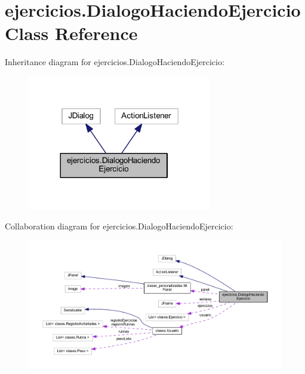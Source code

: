 \hypertarget{classejercicios_1_1_dialogo_haciendo_ejercicio}{}\section{ejercicios.\+Dialogo\+Haciendo\+Ejercicio Class Reference}
\label{classejercicios_1_1_dialogo_haciendo_ejercicio}


Inheritance diagram for ejercicios.\+Dialogo\+Haciendo\+Ejercicio\+:
\nopagebreak
\begin{figure}[H]
\begin{center}
\leavevmode
\includegraphics[width=228pt]{classejercicios_1_1_dialogo_haciendo_ejercicio__inherit__graph}
\end{center}
\end{figure}


Collaboration diagram for ejercicios.\+Dialogo\+Haciendo\+Ejercicio\+:
\nopagebreak
\begin{figure}[H]
\begin{center}
\leavevmode
\includegraphics[width=350pt]{classejercicios_1_1_dialogo_haciendo_ejercicio__coll__graph}
\end{center}
\end{figure}
